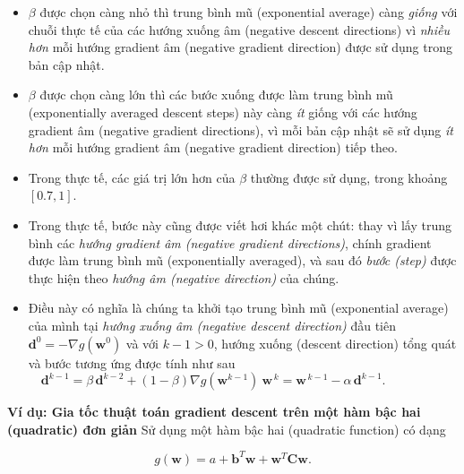 \documentclass{book}
\begin{document}
\begin{itemize}
    \item $\beta$ được chọn càng nhỏ thì trung bình mũ (exponential average) càng \textit{giống} với chuỗi thực tế của các hướng xuống âm (negative descent directions) vì \textit{nhiều hơn} mỗi hướng gradient âm (negative gradient direction) được sử dụng trong bản cập nhật.
    \item $\beta$ được chọn càng lớn thì các bước xuống được làm trung bình mũ (exponentially averaged descent steps) này càng \textit{ít} giống với các hướng gradient âm (negative gradient directions), vì mỗi bản cập nhật sẽ sử dụng \textit{ít hơn} mỗi hướng gradient âm (negative gradient direction) tiếp theo.
    \item Trong thực tế, các giá trị lớn hơn của $\beta$ thường được sử dụng, trong khoảng $\left[0.7,1\right]$.
    \item Trong thực tế, bước này cũng được viết hơi khác một chút: thay vì lấy trung bình các \textit{hướng gradient âm (negative gradient directions)}, chính gradient được làm trung bình mũ (exponentially averaged), và sau đó \textit{bước (step)} được thực hiện theo \textit{hướng âm (negative direction)} của chúng.
    \item Điều này có nghĩa là chúng ta khởi tạo trung bình mũ (exponential average) của mình tại \textit{hướng xuống âm (negative descent direction)} đầu tiên $\mathbf{d}^0 = -\nabla g\left(\mathbf{w}^0\right)$ và với $k-1 > 0$, hướng xuống (descent direction) tổng quát và bước tương ứng được tính như sau
        \begin{equation*}
            \mathbf{d}^{k-1} = \beta \, \mathbf{d}^{k-2} +  \left(1 - \beta\right)\nabla g\left(\mathbf{w}^{k-1}\right) \
            \mathbf{w}^{\,k} = \mathbf{w}^{\,k-1} - \alpha \, \mathbf{d}^{k-1}. \,\,\,\,\,\,\,\,\,\,\,\,\,     \,\,\,\,\,\,\,\,\,\,\,\,\,      \,\,\,
        \end{equation*}
\end{itemize}
\textbf{Ví dụ: Gia tốc thuật toán gradient descent trên một hàm bậc hai (quadratic) đơn giản}
Sử dụng một hàm bậc hai (quadratic function) có dạng

\begin{equation*}
g(\mathbf{w}) = a + \mathbf{b}^T\mathbf{w} + \mathbf{w}^T\mathbf{C}\mathbf{w}.
\end{equation*}
\end{document}

